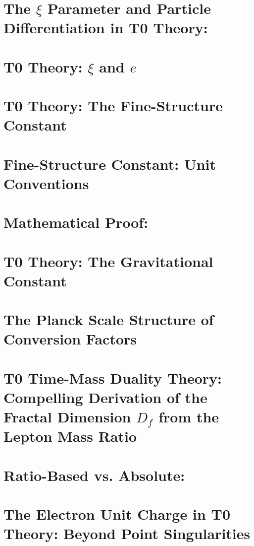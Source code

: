 \chapter{The $\xi$ Parameter and Particle Differentiation in T0 Theory:}

\chapter{T0 Theory: $\xi$ and $e$}

\chapter{T0 Theory: The Fine-Structure Constant}

\chapter{Fine-Structure Constant: Unit Conventions}

\chapter{Mathematical Proof:}

\chapter{T0 Theory: The Gravitational Constant}

\chapter{The Planck Scale Structure of Conversion Factors}

\chapter{T0 Time-Mass Duality Theory: Compelling Derivation of the Fractal Dimension $D_f$ from the Lepton Mass Ratio}

\chapter{Ratio-Based vs. Absolute:}

\chapter{The Electron Unit Charge in T0 Theory: Beyond Point Singularities}

